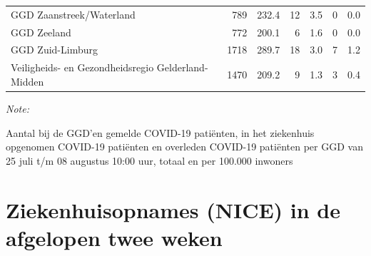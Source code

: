 \documentclass[
  english,
  man,floatsintext]{apa6}
\begin{document}
\begin{table}
\begin{threeparttable}
\begin{tabular}{lrrrrrr}
GGD Zaanstreek/Waterland & 789 & 232.4 & 12 & 3.5 & 0 & 0.0\\
GGD Zeeland & 772 & 200.1 & 6 & 1.6 & 0 & 0.0\\
GGD Zuid-Limburg & 1718 & 289.7 & 18 & 3.0 & 7 & 1.2\\
Veiligheids- en Gezondheidsregio Gelderland-Midden & 1470 & 209.2 & 9 & 1.3 & 3 & 0.4\\
\bottomrule
\end{tabular}
\begin{tablenotes}
\item \textit{Note: } 
\item Aantal bij de GGD’en gemelde COVID-19 patiënten, in het ziekenhuis opgenomen COVID-19 patiënten en overleden COVID-19 patiënten per GGD van 25 juli t/m 08 augustus 10:00 uur, totaal en per 100.000 inwoners
\end{tablenotes}
\end{threeparttable}
\endgroup{}
\end{table}

\newpage

\hypertarget{ziekenhuisopnames-nice-in-de-afgelopen-twee-weken}{%
\section{Ziekenhuisopnames (NICE) in de afgelopen twee weken}\label{ziekenhuisopnames-nice-in-de-afgelopen-twee-weken}}
\end{document}
